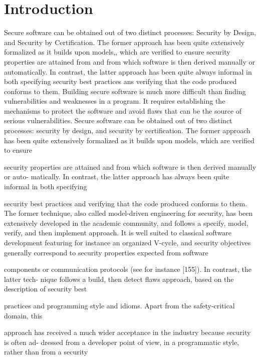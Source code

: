 \documentclass[10pt]{article}
\begin{document}
\section{Introduction}
Secure software can be obtained out of two distinct processes:
Security by Design, and Security by Certification.
The former approach has been quite extensively formalized as it builds upon models,, which are verified to ensure security properties are attained from and from which software is then derived manually or automatically. In contrast, the latter approach has been quite always informal in both specifying security best practices ans verifying that the code produced conforms to them.
Building secure software is much more difficult than finding vulnerabilities and weaknesses
in a program. It requires establishing the mechanisms to protect the software and avoid flaws
that can be the source of serious vulnerabilities. Secure software can be obtained out of two
distinct processes: security by design, and security by certification. The former approach
has been quite extensively formalized as it builds upon models, which are verified to ensure

security properties are attained and from which software is then derived manually or auto-
matically. In contrast, the latter approach has always been quite informal in both specifying

security best practices and verifying that the code produced conforms to them. The former
technique, also called model-driven engineering for security, has been extensively developed in
the academic community, and follows a specify, model, verify, and then implement approach.
It is well suited to classical software development featuring for instance an organized V-cycle,
and security objectives generally correspond to security properties expected from software

components or communication protocols (see for instance [155]). In contrast, the latter tech-
nique follows a build, then detect flaws approach, based on the description of security best

practices and programming style and idioms. Apart from the safety-critical domain, this

approach has received a much wider acceptance in the industry because security is often ad-
dressed from a developer point of view, in a programmatic style, rather than from a security
\end{document}
